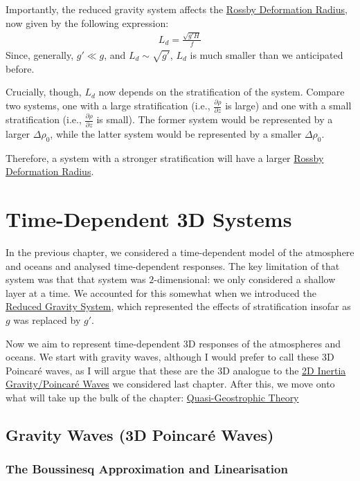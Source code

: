 Importantly, the reduced gravity system affects the \hyperref[SW Def Radius Box]{Rossby Deformation Radius}, now given by the following expression:
\begin{align*}
    L_d = \frac{\sqrt{g' H}}{f}
\end{align*}
Since, generally, \(g'\ll g\), and \(L_d\sim\sqrt{g'}\), \(L_d\) is much smaller than we anticipated before. 

Crucially, though, \(L_d\) now depends on the stratification of the system. Compare two systems, one with a large stratification (i.e., \(\frac{\partial\rho}{\partial z}\) is large) and one with a small stratification (i.e., \(\frac{\partial\rho}{\partial z}\) is small). The former system would be represented by a larger $\Delta \rho_0$, while the latter system would be represented by a smaller $\Delta \rho_0$.

Therefore, a system with a stronger stratification will have a larger \hyperref[SW Def Radius Box]{Rossby Deformation Radius}.

\chapter{Time-Dependent 3D Systems}\label{3D Systems}

In the previous chapter, we considered a time-dependent model of the atmosphere and oceans and analysed time-dependent responses. The key limitation of that system was that that system was \(2\)-dimensional: we only considered a shallow layer at a time. We accounted for this somewhat when we introduced the \hyperref[RG Box]{Reduced Gravity System}, which represented the effects of stratification insofar as \(g\) was replaced by \(g'\). 

Now we aim to represent time-dependent 3D responses of the atmospheres and oceans. We start with gravity waves, although I would prefer to call these 3D Poincaré waves, as I will argue that these are the 3D analogue to the \hyperref[2D Poincare]{2D Inertia Gravity/Poincaré Waves} we considered last chapter. After this, we move onto what will take up the bulk of the chapter: \hyperref[QG]{Quasi-Geostrophic Theory}

\section{Gravity Waves (3D Poincaré Waves)}

\subsection{The Boussinesq Approximation and Linearisation}

